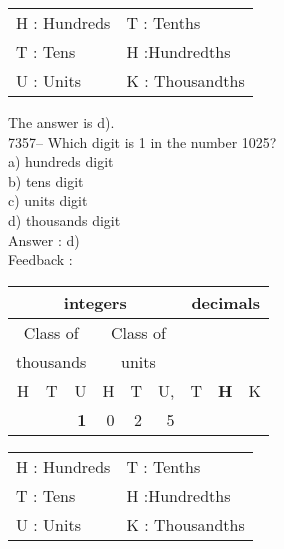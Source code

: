 \documentclass[letterpaper, 12pt]{article}
\begin{document}
\scriptsize
\begin{center}
\begin{tabular}{ll}
H : Hundreds & T\up{th} : Tenths\\
T : Tens & H\up{th} :Hundredths\\
U : Units & K\up{e} : Thousandths\\
\end{tabular}
\end{center}

\normalsize
The answer is d).\\






7357-- Which digit is 1 in the number 1025?\\

a) hundreds digit\\
b) tens digit\\
c) units digit\\
d) thousands digit\\

Answer : d)\\

Feedback :\\
\begin{center}
\begin{tabular}{|rrr|rrr|rrr|}
\hline
\multicolumn{6}{|c|}{integers} &\multicolumn{3}{|c|}{decimals} \\
\hline
\multicolumn{3}{|c|}{Class of} &\multicolumn{3}{|c|}{Class of} &  \multicolumn{3}{c|}{} \\
\multicolumn{3}{|c|}{thousands} &\multicolumn{3}{|c|}{units} &  \multicolumn{3}{c|}{} \\
\hline
H & T & U &H & T & U, & T\up{th} & \textbf{H\up{th}} & K\up{th} \\
\hline
\hline
  &  & \textbf{1} & 0 & 2 & 5 & & & \\
\hline
\end{tabular}
\end{center}

\scriptsize
\begin{center}
\begin{tabular}{ll}
H : Hundreds & T\up{th} : Tenths\\
T : Tens & H\up{th} :Hundredths\\
U : Units & K\up{e} : Thousandths\\
\end{tabular}
\end{center}
\end{document}
